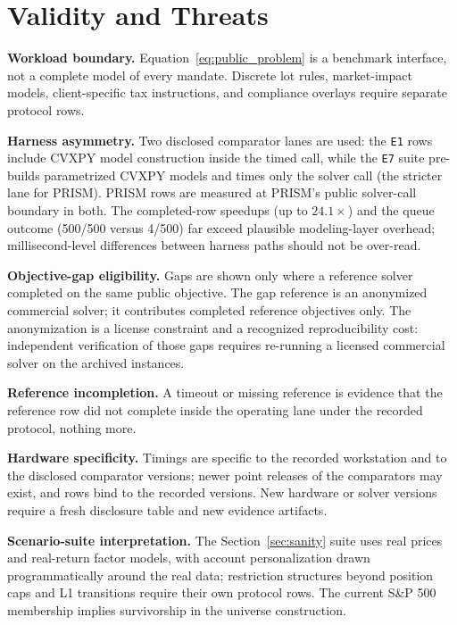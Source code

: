 \documentclass[10pt,a4paper]{extarticle}
\begin{document}
\section{Validity and Threats}
\label{sec:validity}

\textbf{Workload boundary.} Equation~\eqref{eq:public_problem} is a benchmark
interface, not a complete model of every mandate. Discrete lot rules,
market-impact models, client-specific tax instructions, and compliance
overlays require separate protocol rows.

\textbf{Harness asymmetry.} Two disclosed comparator lanes are used: the
\texttt{E1} rows include CVXPY model construction inside the timed call,
while the \texttt{E7} suite pre-builds parametrized CVXPY models and times
only the solver call (the stricter lane for PRISM). PRISM rows are measured
at PRISM's public solver-call boundary in both. The completed-row speedups (up to $24.1\times$) and the queue
outcome (500/500 versus 4/500) far exceed plausible modeling-layer overhead;
millisecond-level differences between harness paths should not be over-read.

\textbf{Objective-gap eligibility.} Gaps are shown only where a reference
solver completed on the same public objective. The gap reference is an
anonymized commercial solver; it contributes completed reference objectives
only. The anonymization is a license constraint and a recognized
reproducibility cost: independent verification of those gaps requires
re-running a licensed commercial solver on the archived instances.

\textbf{Reference incompletion.} A timeout or missing reference is evidence
that the reference row did not complete inside the operating lane under the
recorded protocol, nothing more.

\textbf{Hardware specificity.} Timings are specific to the recorded
workstation and to the disclosed comparator versions; newer point releases of
the comparators may exist, and rows bind to the recorded versions. New
hardware or solver versions require a fresh disclosure table and new evidence
artifacts.

\textbf{Scenario-suite interpretation.} The Section~\ref{sec:sanity} suite
uses real prices and real-return factor models, with account personalization
drawn programmatically around the real data; restriction structures beyond
position caps and L1 transitions require their own protocol rows. The current
S\&P 500 membership implies survivorship in the universe construction.
\end{document}
